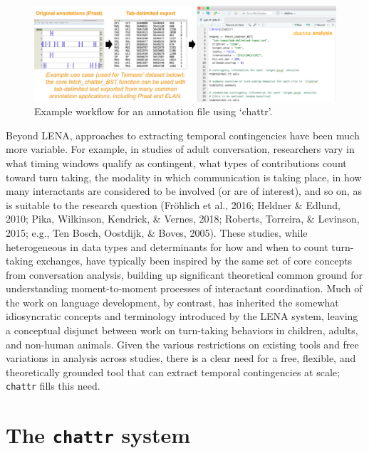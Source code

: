 \documentclass[10pt, letterpaper]{article}
\newenvironment{CodeChunk}{}{}
\begin{document}
\begin{CodeChunk}
\begin{figure}[h]

{\centering \includegraphics{figs/workflow-1} 

}

\caption[Example workflow for an annotation file using `chattr']{Example workflow for an annotation file using `chattr'.}\label{fig:workflow}
\end{figure}
\end{CodeChunk}

Beyond LENA, approaches to extracting temporal contingencies have been
much more variable. For example, in studies of adult conversation,
researchers vary in what timing windows qualify as contingent, what
types of contributions count toward turn taking, the modality in which
communication is taking place, in how many interactants are considered
to be involved (or are of interest), and so on, as is suitable to the
research question (Fröhlich et al., 2016; Heldner \& Edlund, 2010; Pika,
Wilkinson, Kendrick, \& Vernes, 2018; Roberts, Torreira, \& Levinson,
2015; e.g., Ten Bosch, Oostdijk, \& Boves, 2005). These studies, while
heterogeneous in data types and determinants for how and when to count
turn-taking exchanges, have typically been inspired by the same set of
core concepts from conversation analysis, building up significant
theoretical common ground for understanding moment-to-moment processes
of interactant coordination. Much of the work on language development,
by contrast, has inherited the somewhat idiosyncratic concepts and
terminology introduced by the LENA system, leaving a conceptual disjunct
between work on turn-taking behaviors in children, adults, and non-human
animals. Given the various restrictions on existing tools and free
variations in analysis across studies, there is a clear need for a free,
flexible, and theoretically grounded tool that can extract temporal
contingencies at scale; \texttt{chattr} fills this need.

\hypertarget{the-chattr-system}{%
\section{\texorpdfstring{The \texttt{chattr}
system}{The chattr system}}\label{the-chattr-system}}
\end{document}
